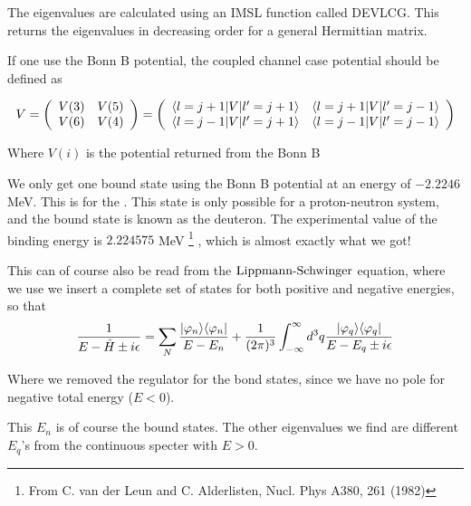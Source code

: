 The eigenvalues are calculated using an IMSL function called DEVLCG. This returns the eigenvalues in decreasing order for a general
Hermittian matrix.

If one use the Bonn B potential, the coupled channel case potential should be defined as

\begin{equation}
V=
\left( \begin{array}{cc}
V(3) & V(5)\\
V(6) & V(4)
\end{array}\right)
=
\left( \begin{array}{cc}
\langle l=j+1|V|l'=j+1\rangle & \langle l=j+1|V|l'=j-1\rangle\\
\langle l=j-1|V|l'=j+1\rangle & \langle l=j-1|V|l'=j-1\rangle
\end{array}\right)
\end{equation}

Where $V(i)$ is the potential returned from the Bonn B


We only get one bound state using the Bonn B potential at an energy of $-2.2246$ MeV.
This is for the . This state is only possible for a 
proton-neutron system, and the bound state is known as the deuteron. 
The experimental value of the binding energy is $2.224575$  MeV
\footnote{From C. van der Leun and C. Alderlisten, Nucl. Phys A380, 261 (1982)}
, which is almost exactly what we got!\nl

This can of course also be read from the $\text{Lippmann-Schwinger}$ equation, where we use we insert a complete set of states for both positive
and negative energies, so that
\begin{equation}
\frac{1}{E-\hat{H}\pm i\epsilon}=\sum_N\frac{|\varphi_n\rangle\langle\varphi_n|}{E-E_n}
+\frac{1}{(2\pi)^3}\int^\infty_{-\infty}d^3q\frac{|\varphi_q\rangle\langle\varphi_q|}{E-E_q\pm i\epsilon}
\end{equation}

Where we removed the regulator for the bond states, since we have no pole for negative total energy ($E<0$). 

This $E_n$ is of course the bound states. The other eigenvalues we find are different $E_q$'s from the continuous 
specter with $E>0$.








